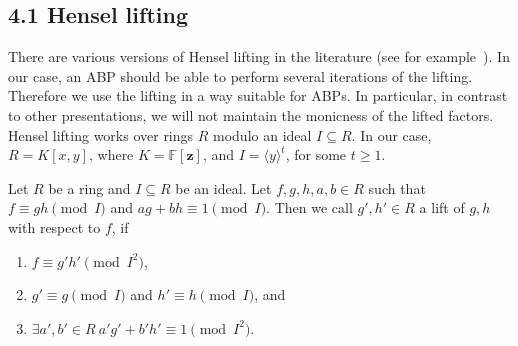 \subsection*{4.1 Hensel lifting}
There are various versions of Hensel lifting in the literature (see for example~\cite{ref18}). In our case, an ABP should be able to perform several iterations of the lifting. Therefore we use the lifting in a way suitable for ABPs. In particular, in contrast to other presentations, we will not maintain the monicness of the lifted factors.
Hensel lifting works over rings $R$ modulo an ideal $I\subseteq R$. In our case,$R=K[x,y]$, where $K=\mathbb F[\mathbf z]$, and $I=\langle y\rangle^t$, for some $t\geq1$.
\begin{ntdefinition}
Let $R$ be a ring and $I\subseteq R$ be an ideal. Let $f,g,h,a,b\in R$ such that $f\equiv gh\pmod I$ and $ag+bh\equiv1\pmod I$. Then we call $g',h'\in R$ a lift of $g,h$ with respect to $f$, if
\begin{enumerate}
\item[(i)] $f\equiv g'h'\pmod{I^2}$,
\item[(ii)] $g'\equiv g\pmod I$ and $h'\equiv h\pmod I$, and
\item[(iii)] $\exists a',b'\in R\ a'g'+b'h'\equiv1\pmod{I^2}$.
\end{enumerate}
\end{ntdefinition}
